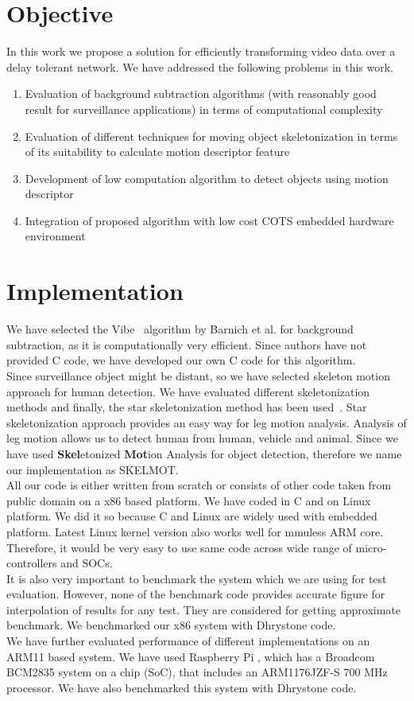 \documentclass[a4paper, 12pt, twoside]{synopsis}  %
\begin{document}
\section{Objective}
\indent	In this work we propose a solution for efficiently transforming
video data   over   a delay   tolerant   network.  We have addressed
the following problems in this work.\\
\begin{enumerate}
\item Evaluation of background subtraction algorithms (with reasonably
good result for surveillance applications) in terms of computational
complexity 
\item Evaluation of different techniques for moving object
skeletonization in terms of its suitability to calculate motion
descriptor feature 
\item Development of low computation algorithm to detect objects using
motion descriptor
\item Integration of proposed algorithm with low cost COTS embedded
hardware environment
\end{enumerate}
\section{Implementation}
\indent We have selected the Vibe~\cite{9} algorithm by Barnich et al.
for background subtraction, as it is computationally very efficient.
Since authors have not provided C code, we have developed our own C code
for this algorithm.\\
\indent Since surveillance object might be distant, so we have selected
skeleton motion approach for human detection. We have evaluated
different skeletonization methods and finally, the star skeletonization
method has been used~\cite{32}. Star skeletonization approach provides
an easy way for leg motion analysis. Analysis of leg motion allows us to
detect human from human, vehicle and animal. Since we have used
\textbf{Skel}etonized \textbf{Mot}ion Analysis for object
detection, therefore we name our implementation as SKELMOT.\\
\indent All our code is either written from scratch or consists of other
code taken from public domain on a x86 based platform. We have coded in
C and on Linux platform. We did it so because C and Linux are widely
used with embedded platform.  Latest Linux kernel version also works
well for mmuless ARM core.  Therefore, it would be very easy to use same
code across wide range of micro-controllers and SOCs.\\
\indent It is also very important to benchmark the system which we are
using for test evaluation. However, none of the benchmark code provides
accurate figure for interpolation of results for any test. They are
considered for getting approximate benchmark. We benchmarked our x86
system with Dhrystone code.\\
\indent We have further evaluated performance of different
implementations on an ARM11 based system. We have used Raspberry Pi ,
which has a Broadcom BCM2835 system on a chip (SoC), that includes an
ARM1176JZF-S 700 MHz processor. We have also benchmarked this system
with Dhrystone code.
\end{document}
